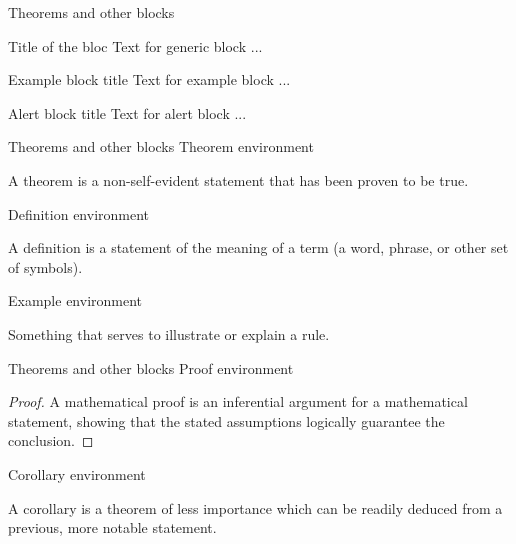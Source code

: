 \documentclass[10pt,t]{beamer}
\begin{document}
\begin{frame}{Theorems and other blocks}
	\begin{block}{Title of the bloc}
	Text for generic block ...
	\end{block}

\vspace{11pt}
	\begin{exampleblock}{Example block title}
	Text for example block ...
	\end{exampleblock}

\vspace{11pt}
	\begin{alertblock}{Alert block title}
	Text for alert block ...
	\end{alertblock}
\end{frame}




\begin{frame}{Theorems and other blocks}
Theorem environment
	\begin{theorem}
	A theorem is a non-self-evident statement that has been proven to be true.
	\end{theorem}

\vspace{11pt}
Definition environment
	\begin{definition}
	A definition is a statement of the meaning of a term (a word, phrase, or other set of symbols).
	\end{definition}

\vspace{11pt}	
Example environment
	\begin{example}
	Something that serves to illustrate or explain a rule.
	\end{example}
\end{frame}




\begin{frame}{Theorems and other blocks}
Proof environment
	\begin{proof}
	A mathematical proof is an inferential argument for a mathematical statement, showing that the stated assumptions logically guarantee the conclusion.
	\end{proof}
	
\vspace{11pt}	
Corollary environment
	\begin{corollary}
	A corollary is a theorem of less importance which can be readily deduced from a previous, more notable statement.
	\end{corollary}

\end{frame}
\end{document}
